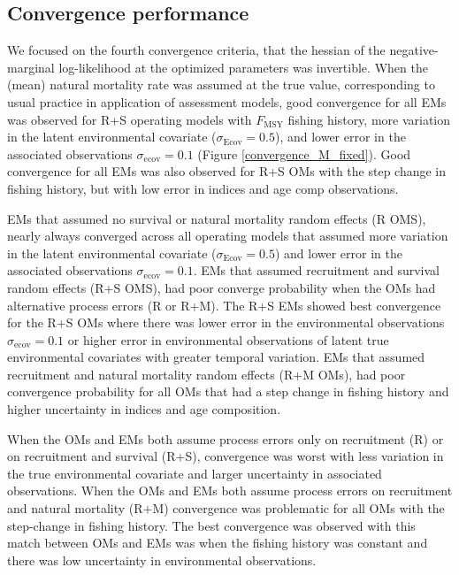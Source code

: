 \documentclass[
  12pt,
]{article}
\newcommand{\Fmsy}{\ensuremath{F_{\text{MSY}}}\xspace}
\begin{document}
\hypertarget{convergence-performance}{%
\subsection*{Convergence performance}\label{convergence-performance}}

We focused on the fourth convergence criteria, that the hessian of the
negative-marginal log-likelihood at the optimized parameters was
invertible. When the (mean) natural mortality rate was assumed at the
true value, corresponding to usual practice in application of assessment
models, good convergence for all EMs was observed for R+S operating
models with \Fmsy fishing history, more variation in the latent
environmental covariate (\(\sigma_\text{Ecov} = 0.5\)), and lower error
in the associated observations \(\sigma_\text{ecov} = 0.1\) (Figure
\ref{convergence_M_fixed}). Good convergence for all EMs was also
observed for R+S OMs with the step change in fishing history, but with
low error in indices and age comp observations.

EMs that assumed no survival or natural mortality random effects (R
OMS), nearly always converged across all operating models that assumed
more variation in the latent environmental covariate
(\(\sigma_\text{Ecov} = 0.5\)) and lower error in the associated
observations \(\sigma_\text{ecov} = 0.1\). EMs that assumed recruitment
and survival random effects (R+S OMS), had poor converge probability
when the OMs had alternative process errors (R or R+M). The R+S EMs
showed best convergence for the R+S OMs where there was lower error in
the environmental observations \(\sigma_\text{ecov} = 0.1\) or higher
error in environmental observations of latent true environmental
covariates with greater temporal variation. EMs that assumed recruitment
and natural mortality random effects (R+M OMs), had poor convergence
probability for all OMs that had a step change in fishing history and
higher uncertainty in indices and age composition.

When the OMs and EMs both assume process errors only on recruitment (R)
or on recruitment and survival (R+S), convergence was worst with less
variation in the true environmental covariate and larger uncertainty in
associated observations. When the OMs and EMs both assume process errors
on recruitment and natural mortality (R+M) convergence was problematic
for all OMs with the step-change in fishing history. The best
convergence was observed with this match between OMs and EMs was when
the fishing history was constant and there was low uncertainty in
environmental observations.
\end{document}
